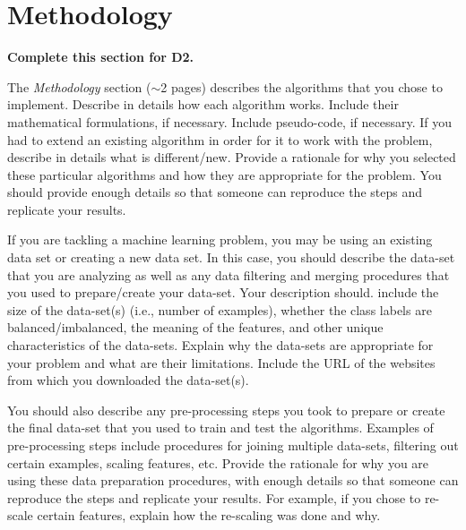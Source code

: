 \documentclass[letterpaper]{article} %
\begin{document}

\section{Methodology}

{\bf Complete this section for D2.}

The {\it Methodology } section ($\sim$2 pages) describes the algorithms that you chose to implement.  Describe in details how each algorithm works.  Include their mathematical formulations, if necessary.  Include pseudo-code, if necessary.  If you had to extend an existing algorithm in order for it to work with the problem, describe in details what is different/new.  Provide a rationale for why you selected these particular algorithms and how they are appropriate for the problem.  You should provide enough details so that someone can reproduce the steps and replicate your results.  

If you are tackling a machine learning problem, you may be using an existing data set or creating a new data set.  In this case, you should describe the data-set that you are analyzing as well as any data filtering and merging procedures that you used to prepare/create your data-set.  Your description should. include the size of the data-set(s) (i.e., number of examples), whether the class labels are balanced/imbalanced, the meaning of the features, and other unique characteristics of the data-sets.   Explain why the data-sets are appropriate for your problem and what are their limitations.  Include the URL of the websites from which you downloaded the data-set(s).

You should also describe any pre-processing steps you took to prepare or create the final data-set that you used to train and test the algorithms.  Examples of pre-processing steps include procedures for joining multiple data-sets, filtering out certain examples, scaling features, etc.  Provide the rationale for why you are using these data preparation procedures, with enough details so that someone can reproduce the steps and replicate your results.   For example, if you chose to re-scale certain features, explain how the re-scaling was done and why.   


\end{document}
